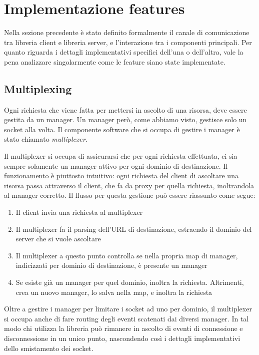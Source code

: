 \documentclass[12pt,a4paper,openright,twoside]{report}
\begin{document}
\section{Implementazione features}

Nella sezione precedente è stato definito formalmente il canale di comunicazione tra libreria client e libreria server, e l'interazione tra i componenti principali. Per quanto riguarda i dettagli implementativi specifici dell'una o dell'altra, vale la pena analizzare singolarmente come le feature siano state implementate.

\subsection{Multiplexing}

Ogni richiesta che viene fatta per mettersi in ascolto di una risorsa, deve essere gestita da un manager. Un manager però, come abbiamo visto, gestisce solo un socket alla volta. Il componente software che si occupa di gestire i manager è stato chiamato \textit{multiplexer}.

\bigskip

Il multiplexer si occupa di assicurarsi che per ogni richiesta effettuata, ci sia sempre solamente un manager attivo per ogni dominio di destinazione. Il funzionamento è piuttosto intuitivo: ogni richiesta del client di ascoltare una risorsa passa attraverso il client, che fa da proxy per quella richiesta, inoltrandola al manager corretto. Il flusso per questa gestione può essere riassunto come segue:
\begin{enumerate}
\item Il client invia una richiesta al multiplexer
\item Il multiplexer fa il parsing dell'URL di destinazione, estraendo il dominio del server che si vuole ascoltare
\item Il multiplexer a questo punto controlla se nella propria map di manager, indicizzati per dominio di destinazione, è presente un manager
\item Se esiste già un manager per quel dominio, inoltra la richiesta. Altrimenti, crea un nuovo manager, lo salva nella map, e inoltra la richiesta
\end{enumerate}

Oltre a gestire i manager per limitare i socket ad uno per dominio, il multiplexer si occupa anche di fare routing degli eventi scatenati dai diversi manager. In tal modo chi utilizza la libreria può rimanere in ascolto di eventi di connessione e disconnessione in un unico punto, nascondendo così i dettagli implementativi dello smistamento dei socket.
\end{document}
